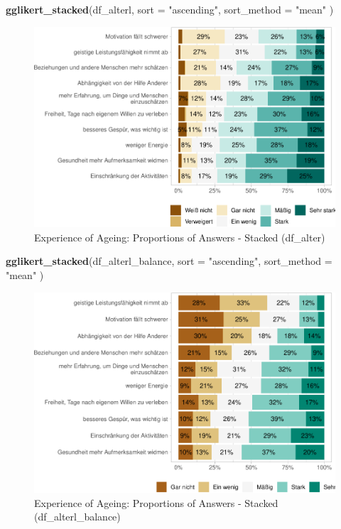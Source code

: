 \documentclass[
  doc]{apa6}
\newenvironment{Shaded}{\begin{snugshade}}{\end{snugshade}}
\newcommand{\AttributeTok}[1]{\textcolor[rgb]{0.13,0.29,0.53}{#1}}
\newcommand{\FunctionTok}[1]{\textcolor[rgb]{0.13,0.29,0.53}{\textbf{#1}}}
\newcommand{\NormalTok}[1]{#1}
\newcommand{\StringTok}[1]{\textcolor[rgb]{0.31,0.60,0.02}{#1}}
\begin{document}
\begin{Shaded}
\begin{Highlighting}[]
\FunctionTok{gglikert\_stacked}\NormalTok{(df\_alterl,}
                 \AttributeTok{sort =} \StringTok{"ascending"}\NormalTok{,}
                 \AttributeTok{sort\_method =} \StringTok{"mean"}
\NormalTok{                 )}
\end{Highlighting}
\end{Shaded}

\begin{figure}
\centering
\includegraphics{desc_NRW80_files/figure-latex/likertalterl3-1.pdf}
\caption{\label{fig:likertalterl3}Experience of Ageing: Proportions of Answers - Stacked (df\_alter)}
\end{figure}

\begin{Shaded}
\begin{Highlighting}[]
\FunctionTok{gglikert\_stacked}\NormalTok{(df\_alterl\_balance,}
                 \AttributeTok{sort =} \StringTok{"ascending"}\NormalTok{,}
                 \AttributeTok{sort\_method =} \StringTok{"mean"}
\NormalTok{                 )}
\end{Highlighting}
\end{Shaded}

\begin{figure}
\centering
\includegraphics{desc_NRW80_files/figure-latex/likertalterl4-1.pdf}
\caption{\label{fig:likertalterl4}Experience of Ageing: Proportions of Answers - Stacked (df\_alterl\_balance)}
\end{figure}
\end{document}
